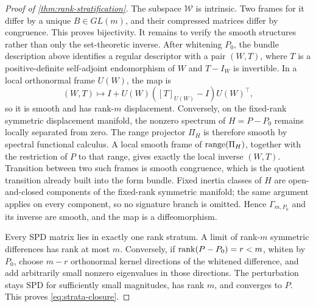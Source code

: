 \begin{proof}[Proof of \cref{thm:rank-stratification}]
The subspace \(\mathcal W\) is intrinsic.  Two frames for it differ by a
unique \(B\in GL(m)\), and their compressed matrices differ by congruence.
This proves bijectivity.  It remains to verify the smooth structures rather
than only the set-theoretic inverse.  After whitening \(P_0\), the bundle
description above identifies a regular descriptor with a pair \((W,T)\),
where \(T\) is a positive-definite self-adjoint endomorphism of \(W\) and
\(T-I_W\) is invertible.  In a local orthonormal frame \(U(W)\), the map is
\[
  (W,T)\longmapsto I+U(W)([T]_{U(W)}-I)U(W)^\top,
\]
so it is smooth and has rank-\(m\) displacement.  Conversely, on the
fixed-rank symmetric displacement manifold, the nonzero spectrum of
\(H=P-P_0\) remains locally separated from zero.  The range projector
\(\Pi_H\) is therefore smooth by spectral functional calculus.  A local
smooth frame of \(\operatorname{range}(\Pi_H)\), together with the restriction of \(P\) to
that range, gives exactly the local inverse \((W,T)\).  Transition between
two such frames is smooth congruence, which is the quotient transition
already built into the form bundle.  Fixed inertia classes of \(H\) are
open-and-closed components of the fixed-rank symmetric manifold; the same
argument applies on every component, so no signature branch is omitted.
Hence \(\Gamma_{m,P_0}\) and its inverse are smooth, and the map is a
diffeomorphism.

Every SPD matrix lies in exactly one rank stratum.  A limit of rank-\(m\)
symmetric differences has rank at most \(m\).  Conversely, if
\(\operatorname{rank}(P-P_0)=r<m\), whiten by \(P_0\), choose \(m-r\) orthonormal kernel
directions of the whitened difference, and add arbitrarily small nonzero
eigenvalues in those directions.  The perturbation stays SPD for sufficiently
small magnitudes, has rank \(m\), and converges to \(P\).  This proves
\eqref{eq:strata-closure}.
\end{proof}

